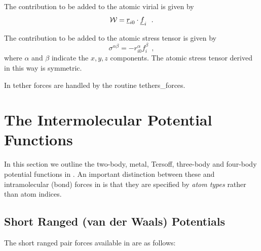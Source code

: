 The contribution to be added to the atomic virial is given by
\begin{equation}
{\cal W} = \mbox{$\underline{r}$}_{i0} \cdot \mbox{$\underline{f}$}_{i}~~.
\end{equation}

The contribution to be added to the atomic stress tensor is given
by
\begin{equation}
\sigma^{\alpha \beta} = -r_{i0}^{\alpha} f_{i}^{\beta}~~,
\end{equation}
where $\alpha$ and $\beta$ indicate the $x,y,z$ components.  The
atomic stress tensor derived in this way is
symmetric.

In \D tether forces are handled by the routine {\sc tethers\_forces}.

\section{The Intermolecular Potential Functions}

In this section we outline the two-body,
metal, Tersoff,
three-body and
four-body potential functions in \D.
An important distinction between these and
intramolecular (bond) forces in \D is
that they are specified by {\em atom types} rather than atom indices.

\subsection{Short Ranged (van der Waals) Potentials}
\label{vdw}

The short ranged pair forces available in \D are as
follows:


